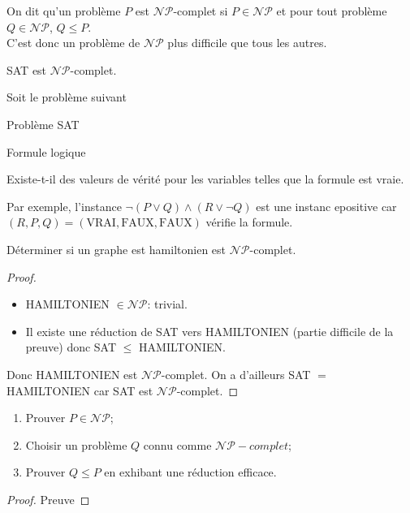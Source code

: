 \begin{mydef}
  On dit qu'un problème $P$ est $\mathcal{NP}$-complet si $P \in \mathcal{NP}$ et pour tout problème $Q \in \mathcal{NP}$, $Q \leq P$.\\
  C'est donc un problème de $\mathcal{NP}$ plus difficile que tous les autres.
\end{mydef}

\begin{mytheo} [Cook]
  SAT est $\mathcal{NP}$-complet.
\end{mytheo}

\begin{myexem}
  Soit le problème suivant
  \begin{description}
    \item{Problème} SAT
    \item[Instance] Formule logique
    \item[Question] Existe-t-il des valeurs de vérité pour les variables telles que la formule est vraie.
  \end{description}
  Par exemple, l'instance $\lnot(P \lor Q) \land (R \lor \lnot Q)$ est une instanc epositive car
  $(R, P, Q) = (\text{VRAI}, \text{FAUX}, \text{FAUX})$ vérifie la formule.
\end{myexem}

\begin{mytheo} [Karp]
  Déterminer si un graphe est hamiltonien est $\mathcal{NP}$-complet.
  \begin{proof}
    \begin{itemize}
      \item HAMILTONIEN $\in \mathcal{NP}$: trivial.
      \item Il existe une réduction de SAT vers HAMILTONIEN (partie difficile de la preuve) donc
        SAT $\leq$ HAMILTONIEN.
    \end{itemize}
    Donc HAMILTONIEN est $\mathcal{NP}$-complet.
    On a d'ailleurs SAT $=$ HAMILTONIEN car SAT est $\mathcal{NP}$-complet.
  \end{proof}
\end{mytheo}

\begin{mytheo} 
  \begin{enumerate}
    \item Prouver $P \in \mathcal{NP}$;
    \item Choisir un problème $Q$ connu comme $\mathcal{NP}-complet$;
    \item Prouver $Q \leq P$ en exhibant une réduction efficace.
  \end{enumerate}
  \begin{proof}
     Preuve \addTODO
  \end{proof}
\end{mytheo}

